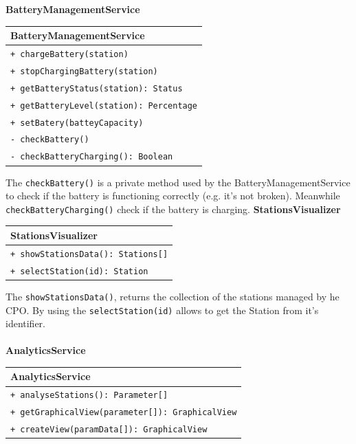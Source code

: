 \textbf{BatteryManagementService}\\
\begin{table}[H]
    \centering
    \begin{tabular}{|l|}
        \hline
        \textbf{BatteryManagementService} \\
        \hline
        \verb|+ chargeBattery(station)|\\
        \verb|+ stopChargingBattery(station)|\\
        \verb|+ getBatteryStatus(station): Status|\\
        \verb|+ getBatteryLevel(station): Percentage|\\
        \verb|+ setBatery(batteyCapacity)|\\
        \verb|- checkBattery()|\\
        \verb|- checkBatteryCharging(): Boolean|\\
        \hline
    \end{tabular}
\end{table}
The \verb|checkBattery()| is a private method used by the BatteryManagementService to check if the battery is functioning correctly (e.g. it's not broken). Meanwhile \verb|checkBatteryCharging()| check if the battery is charging.
\textbf{StationsVisualizer}\\
\begin{table}[H]
    \centering
    \begin{tabular}{|l|}
        \hline
        \textbf{StationsVisualizer} \\
        \hline
        \verb|+ showStationsData(): Stations[]|\\
        \verb|+ selectStation(id): Station|\\
        \hline
    \end{tabular}
\end{table}
The \verb|showStationsData()|, returns the collection of the stations managed by he CPO. By using the \verb|selectStation(id)| allows to get the Station from it's identifier.\\
\\
\clearpage
\textbf{AnalyticsService}\\
\begin{table}[H]
    \centering
    \begin{tabular}{|l|}
        \hline
        \textbf{AnalyticsService} \\
        \hline
        \verb|+ analyseStations(): Parameter[]|\\
        \verb|+ getGraphicalView(parameter[]): GraphicalView|\\
        \verb|+ createView(paramData[]): GraphicalView|\\
        \hline
    \end{tabular}
\end{table}

